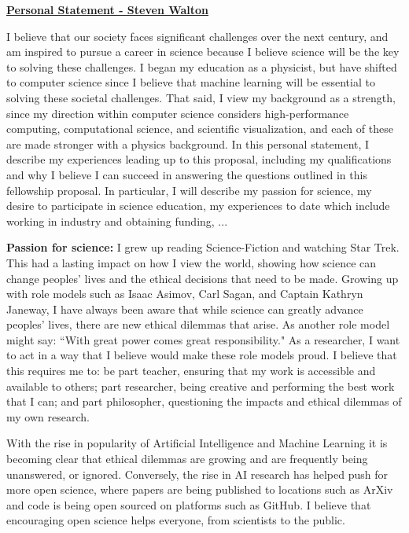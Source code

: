 \documentclass[12pt]{article}
\begin{document}
\begin{center}
\underline{\bf Personal Statement - Steven Walton}\\
\end{center}
I believe that our society faces significant challenges over the next century,
and am inspired to pursue a career in science because I believe science will
be the key to solving these challenges.
%
I began my education as a physicist, but have shifted to computer science since
I believe that machine learning will be essential to solving these societal challenges.
%
That said, I view my background as a strength, 
since my direction within computer science considers high-performance computing, 
computational science, and scientific visualization, and each of these are
made stronger with a physics background.
%
In this personal statement, I describe my experiences leading up to this proposal,
including my qualifications and why I believe I can succeed in answering the questions
outlined in this fellowship proposal.
%
In particular, I will describe my passion for science, 
	my desire to participate in science education, 
	my experiences to date which include working in industry and obtaining funding, 
	...
%

\textbf{Passion for science:} I grew up reading Science-Fiction and watching Star Trek. This had a lasting
impact on how I view the world, showing how science can change peoples' lives
and the ethical decisions that need to be made. Growing up with role models such
as Isaac Asimov, Carl Sagan, and Captain Kathryn Janeway, I have always been
aware that while science can greatly advance peoples' lives, there are new
ethical dilemmas that arise. As another role model might say: ``With great power
comes great responsibility." As a researcher, I want to act in a way that I
believe would make these role models proud. I believe that this requires me to:
be part teacher, ensuring that my work is accessible and available to others;
part researcher, being creative and performing the best work that I can; and
part philosopher, questioning the impacts and ethical dilemmas of my own
research.

With the rise in popularity of Artificial Intelligence and Machine Learning it
is becoming clear that ethical dilemmas are growing and are frequently being
unanswered, or ignored. Conversely, the rise in AI research has helped push for
more open science, where papers are being published to locations such as ArXiv
and code is being open sourced on platforms such as GitHub. I believe that 
encouraging open science helps everyone, from scientists to the public. 
\end{document}
